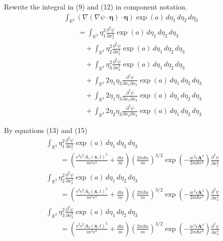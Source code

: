 \documentclass[12pt]{article}
\begin{document}
Rewrite the integral in (9) and (12) in component notation.
\begin{align*}
&\int_{\mathbb R^3}
(\nabla(\nabla\psi\cdot\boldsymbol\eta)\cdot\boldsymbol\eta)
\exp(a)\,d\eta_1\,d\eta_2\,d\eta_3
\\
&\qquad{}=\int_{\mathbb R^3}
\eta_1^2\frac{\partial^2\psi}{\partial x_1^2}
\exp(a)\,d\eta_1\,d\eta_2\,d\eta_3
\\
&\qquad\quad{}+\int_{\mathbb R^3}
\eta_2^2\frac{\partial^2\psi}{\partial x_2^2}
\exp(a)\,d\eta_1\,d\eta_2\,d\eta_3
\\
&\qquad\quad{}+\int_{\mathbb R^3}
\eta_3^2\frac{\partial^2\psi}{\partial x_3^2}
\exp(a)\,d\eta_1\,d\eta_2\,d\eta_3
\\
&\qquad\quad{}+\int_{\mathbb R^3}
2\eta_1\eta_2\frac{\partial^2\psi}{\partial x_1\partial x_2}
\exp(a)\,d\eta_1\,d\eta_2\,d\eta_3
\\
&\qquad\quad{}+\int_{\mathbb R^3}
2\eta_1\eta_3\frac{\partial^2\psi}{\partial x_1\partial x_3}
\exp(a)\,d\eta_1\,d\eta_2\,d\eta_3
\\
&\qquad\quad{}+\int_{\mathbb R^3}
2\eta_2\eta_3\frac{\partial^2\psi}{\partial x_2\partial x_3}
\exp(a)\,d\eta_1\,d\eta_2\,d\eta_3
\end{align*}

By equations (13) and (15)
\begin{align*}
&\int_{\mathbb R^3}
\eta_1^2\frac{\partial^2\psi}{\partial x_1^2}
\exp(a)\,d\eta_1\,d\eta_2\,d\eta_3
\\
&\qquad{}=\left(\frac{e^2\epsilon^2 A_1(\mathbf x,t)^2}{m^2c^2}+\frac{i\hbar\epsilon}{m}\right)
\left(\frac{2\pi i\hbar\epsilon}{m}\right)^{3/2}
\exp\left(-\frac{ie^2\epsilon\mathbf A^2}{2m\hbar c^2}\right)
\frac{\partial^2\psi}{\partial x_1^2}
\\
&\int_{\mathbb R^3}
\eta_2^2\frac{\partial^2\psi}{\partial x_2^2}
\exp(a)\,d\eta_1\,d\eta_2\,d\eta_3
\\
&\qquad{}=\left(\frac{e^2\epsilon^2 A_2(\mathbf x,t)^2}{m^2c^2}+\frac{i\hbar\epsilon}{m}\right)
\left(\frac{2\pi i\hbar\epsilon}{m}\right)^{3/2}
\exp\left(-\frac{ie^2\epsilon\mathbf A^2}{2m\hbar c^2}\right)
\frac{\partial^2\psi}{\partial x_2^2}
\\
&\int_{\mathbb R^3}
\eta_3^2\frac{\partial^2\psi}{\partial x_3^2}
\exp(a)\,d\eta_1\,d\eta_2\,d\eta_3
\\
&\qquad{}=\left(\frac{e^2\epsilon^2 A_3(\mathbf x,t)^2}{m^2c^2}+\frac{i\hbar\epsilon}{m}\right)
\left(\frac{2\pi i\hbar\epsilon}{m}\right)^{3/2}
\exp\left(-\frac{ie^2\epsilon\mathbf A^2}{2m\hbar c^2}\right)
\frac{\partial^2\psi}{\partial x_3^2}
\end{align*}
\end{document}
